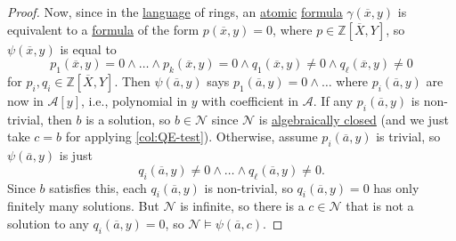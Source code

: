 \begin{proof}
	Now, since in the \hyperref[def:language]{language} of rings, an \hyperref[not:atomic]{atomic} \hyperref[def:formula]{formula} \(\gamma (\overline{x} , y)\) is equivalent to a \hyperref[def:formula]{formula} of the form \(p(\overline{x} , y) = 0\), where \(p\in \mathbb{Z} [\overline{X} , Y]\), so \(\psi (\overline{x} , y)\) is equal to
	\[
		p_1(\overline{x} , y) = 0 \land \dots \land p_k(\overline{x} , y) = 0 \land q_1(\overline{x} , y) \neq 0 \land q_{\ell } (\overline{x} , y) \neq 0
	\]
	for \(p_i, q_i\in \mathbb{Z} [\overline{X} , Y]\). Then \(\psi (\overline{a} , y)\) says \(p_1(\overline{a} , y) = 0 \land \dots\) where \(p_i(\overline{a} , y)\) are now in \(\mathcal{A} [y]\), i.e., polynomial in \(y\) with coefficient in \(\mathcal{A} \). If any \(p_i(\overline{a} , y)\) is non-trivial, then \(b\) is a solution, so \(b\in \mathcal{N} \) since \(\mathcal{N} \) is \hyperref[def:algebraically-closed]{algebraically closed} (and we just take \(c = b\) for applying \autoref{col:QE-test}). Otherwise, assume \(p_i(\overline{a} , y)\) is trivial, so \(\psi (\overline{a} ,y)\) is just
	\[
		q_i(\overline{a} , y) \neq 0 \land \dots \land q_{\ell } (\overline{a} , y) \neq 0.
	\]
	Since \(b\) satisfies this, each \(q_i(\overline{a} , y)\) is non-trivial, so \(q_i(\overline{a} , y) = 0\) has only finitely many solutions. But \(\mathcal{N} \) is infinite, so there is a \(c\in \mathcal{N} \) that is not a solution to any \(q_i(\overline{a} , y) = 0\), so \(\mathcal{N} \models \psi (\overline{a} , c)\).
\end{proof}